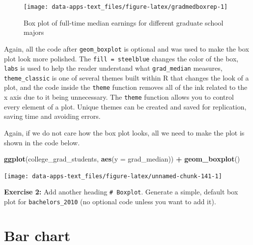 \documentclass[
]{book}
\makeatletter
\newenvironment{Shaded}{\begin{snugshade}}{\end{snugshade}}
\newcommand{\AttributeTok}[1]{\textcolor[rgb]{0.27,0.27,0.27}{#1}}
\newcommand{\FunctionTok}[1]{\textcolor[rgb]{0.27,0.27,0.27}{\textbf{#1}}}
\newcommand{\NormalTok}[1]{#1}
\newcommand{\SpecialCharTok}[1]{\textcolor[rgb]{0.43,0.43,0.43}{\textbf{#1}}}
\newenvironment{kframe}{%
\medskip{}
\setlength{\fboxsep}{.8em}
 \def\at@end@of@kframe{}%
 \ifinner\ifhmode%
  \def\at@end@of@kframe{\end{minipage}}%
  \begin{minipage}{\columnwidth}%
 \fi\fi%
 \def\FrameCommand##1{\hskip\@totalleftmargin \hskip-\fboxsep
 \colorbox{shadecolor}{##1}\hskip-\fboxsep
     \hskip-\linewidth \hskip-\@totalleftmargin \hskip\columnwidth}%
 \MakeFramed {\advance\hsize-\width
   \@totalleftmargin\z@ \linewidth\hsize
   \@setminipage}}%
 {\par\unskip\endMakeFramed%
 \at@end@of@kframe}
\renewenvironment{Shaded}{\begin{kframe}}{\end{kframe}}
\newenvironment{rmdblock}[1]
  {\begin{shaded*}
  }
  {\end{shaded*}
  }
\newenvironment{learncheck}
  {\begin{rmdblock}{warning}}
  {\end{rmdblock}}
\makeatother
\begin{document}
\begin{figure}

{\centering \texttt{[image: data-apps-text\_files/figure-latex/gradmedboxrep-1]} 

}

\caption{Box plot of full-time median earnings for different graduate school majors}\label{fig:gradmedboxrep}
\end{figure}

Again, all the code after \texttt{geom\_boxplot} is optional and was used to make the box plot look more polished. The \texttt{fill\ =\ \textquotesingle{}steelblue\textquotesingle{}} changes the color of the box, \texttt{labs} is used to help the reader understand what \texttt{grad\_median} measures, \texttt{theme\_classic} is one of several themes built within R that changes the look of a plot, and the code inside the \texttt{theme} function removes all of the ink related to the x axis due to it being unnecessary. The \texttt{theme} function allows you to control every element of a plot. Unique themes can be created and saved for replication, saving time and avoiding errors.

Again, if we do not care how the box plot looks, all we need to make the plot is shown in the code below.

\begin{Shaded}
\begin{Highlighting}[]
\FunctionTok{ggplot}\NormalTok{(college\_grad\_students, }\FunctionTok{aes}\NormalTok{(}\AttributeTok{y =}\NormalTok{ grad\_median)) }\SpecialCharTok{+}
  \FunctionTok{geom\_boxplot}\NormalTok{()}
\end{Highlighting}
\end{Shaded}

\begin{center}\texttt{[image: data-apps-text\_files/figure-latex/unnamed-chunk-141-1]} \end{center}

\begin{learncheck}
\textbf{Exercise 2:} Add another heading \texttt{\#\ Boxplot}. Generate
a simple, default box plot for \texttt{bachelors\_2010} (no optional
code unless you want to add it).
\end{learncheck}

\hypertarget{bar-chart-2}{%
\section{Bar chart}\label{bar-chart-2}}
\end{document}
